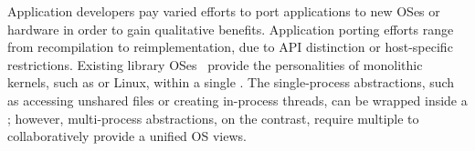 Application developers pay varied efforts to port applications
to new OSes or hardware
in order to gain qualitative benefits.
Application porting efforts range from recompilation to reimplementation,
due to
API distinction
or host-specific restrictions.
Existing library OSes~\cite{porter11drawbridge, baumann13bascule, baumann14haven}
provide the personalities of monolithic kernels, such as \win{} or Linux,
within a single \picoproc{}.
The single-process abstractions,
such as accessing unshared files or creating in-process threads,
can be wrapped inside a \libos{};
however, multi-process abstractions, on the contrast, require
multiple \picoprocs{} to collaboratively provide a unified OS views.



